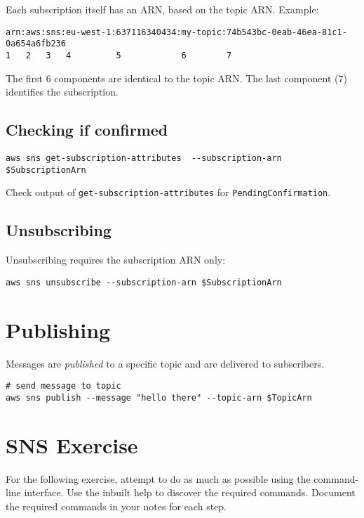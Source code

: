 Each subscription itself has an ARN, based on the topic ARN. Example:

\begin{verbatim}
arn:aws:sns:eu-west-1:637116340434:my-topic:74b543bc-0eab-46ea-81c1-0a654a6fb236
1   2   3   4         5            6        7
\end{verbatim}

The first 6 components are identical to the topic ARN. The last
component (7) identifies the subscription.

\subsection{Checking if confirmed}\label{checking-if-confirmed}

\begin{verbatim}
aws sns get-subscription-attributes  --subscription-arn $SubscriptionArn
\end{verbatim}

Check output of \texttt{get-subscription-attributes} for \texttt{PendingConfirmation}.

\subsection{Unsubscribing}\label{unsubscribing}

Unsubscribing requires the subscription ARN only:

\begin{verbatim}
aws sns unsubscribe --subscription-arn $SubscriptionArn
\end{verbatim}

\section{Publishing}\label{publishing}

Messages are \emph{published} to a specific topic and are delivered to
subscribers.

\begin{verbatim}
# send message to topic 
aws sns publish --message "hello there" --topic-arn $TopicArn
\end{verbatim}


\section{SNS Exercise}
\label{sec:sns-exercise}

For the following exercise, attempt to do as much as possible using the command-line interface.
Use the inbuilt help to discover the required commands.
Document the required commands in your notes for each step.


